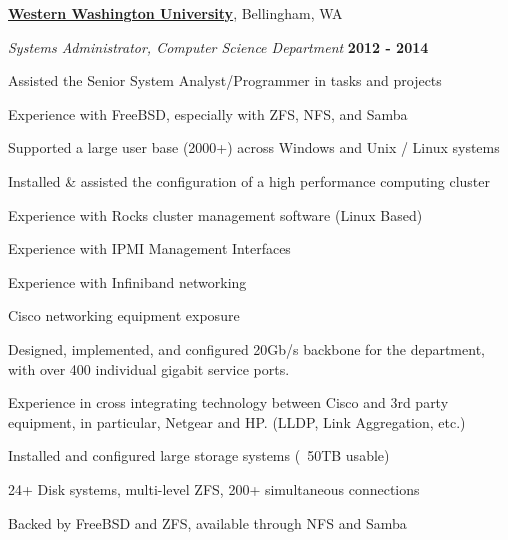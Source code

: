 \documentclass[10pt]{article}
\newcommand{\halfblankline}{\quad\vspace{-0.5\baselineskip}\pagebreak[3]}
\begin{document}
\halfblankline

\href{http://www.wwu.edu/}{\textbf{Western Washington University}}, Bellingham, WA
\begin{outerlist}
  \item[] \textit{Systems Administrator, Computer Science Department}
  \hfill \textbf{2012 - 2014}
  \begin{innerlist}
    \item Assisted the Senior System Analyst/Programmer in tasks and projects
    \item Experience with FreeBSD, especially with ZFS, NFS, and Samba
    \item Supported a large user base (2000+) across Windows and Unix / Linux systems
    \item Installed \& assisted the configuration of a high performance computing cluster
    \begin{innerlist}
      \item Experience with Rocks cluster management software (Linux Based)
      \item Experience with IPMI Management Interfaces
      \item Experience with Infiniband networking
    \end{innerlist}
    \item Cisco networking equipment exposure
    \begin{innerlist}
      \item Designed, implemented, and configured 20Gb/s backbone for the 
            department, \\with over 400 individual gigabit service ports.
      \item Experience in cross integrating technology between Cisco and 3rd party
            equipment, in particular, Netgear and HP. (LLDP, Link Aggregation, etc.)
    \end{innerlist}
    \item Installed and configured large storage systems (~50TB usable)
    \begin{innerlist}
      \item 24+ Disk systems, multi-level ZFS, 200+ simultaneous connections
      \item Backed by FreeBSD and ZFS, available through NFS and Samba
    \end{innerlist}
  \end{innerlist}
\end{outerlist}

\halfblankline
\end{document}
